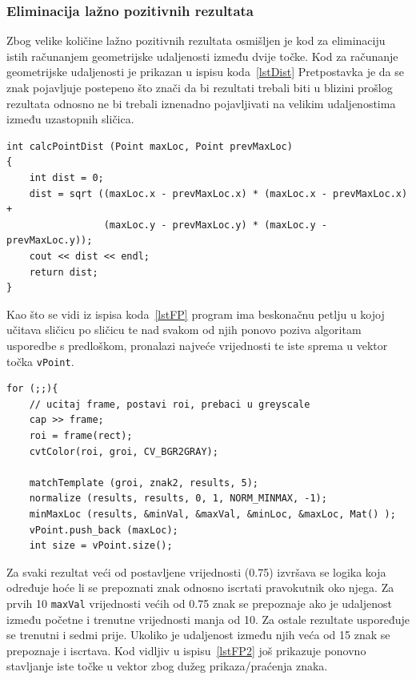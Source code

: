 \newpage
\subsubsection{Eliminacija lažno pozitivnih rezultata} %
\label{ssub:Eliminacija lažno pozitivnih rezultata}

Zbog velike količine lažno pozitivnih rezultata osmišljen je kod za
eliminaciju istih računanjem geometrijske udaljenosti između dvije
točke. Kod za računanje geometrijske udaljenosti je prikazan u ispisu
koda~\ref{lstDist} Pretpostavka je da se znak pojavljuje postepeno što
znači da bi rezultati trebali biti u blizini prošlog rezultata odnosno ne
bi trebali iznenadno pojavljivati na velikim udaljenostima između
uzastopnih sličica. 

\begin{lstlisting}[label=lstDist,caption={Izvorni kod računanja
geometrijske udaljenosti između dvije točke}]
int calcPointDist (Point maxLoc, Point prevMaxLoc)
{
    int dist = 0;
    dist = sqrt ((maxLoc.x - prevMaxLoc.x) * (maxLoc.x - prevMaxLoc.x) +
                 (maxLoc.y - prevMaxLoc.y) * (maxLoc.y - prevMaxLoc.y));    
    cout << dist << endl;
    return dist;
}
\end{lstlisting}

Kao što se vidi iz ispisa koda~\ref{lstFP} program ima beskonačnu petlju
u kojoj učitava sličicu po sličicu te nad svakom od njih ponovo poziva
algoritam usporedbe s predloškom, pronalazi najveće vrijednosti te 
iste sprema u vektor točka \texttt{vPoint}. 

\begin{lstlisting}[label=lstFP,caption={Izvorni kod obrade svih učitanih
        sličica }]
for (;;){
    // ucitaj frame, postavi roi, prebaci u greyscale
    cap >> frame;              
    roi = frame(rect);
    cvtColor(roi, groi, CV_BGR2GRAY);
    
    matchTemplate (groi, znak2, results, 5);
    normalize (results, results, 0, 1, NORM_MINMAX, -1);
    minMaxLoc (results, &minVal, &maxVal, &minLoc, &maxLoc, Mat() );
    vPoint.push_back (maxLoc);
    int size = vPoint.size();
\end{lstlisting}
    
Za svaki rezultat veći od postavljene vrijednosti (0.75) izvršava se
logika koja određuje hoće li se prepoznati znak odnosno iscrtati
pravokutnik oko njega. Za prvih 10 \texttt{maxVal} vrijednosti većih od
0.75 znak se prepoznaje ako je udaljenost između početne i trenutne
vrijednosti manja od 10. Za ostale rezultate uspoređuje se trenutni i
sedmi prije. Ukoliko je udaljenost između njih veća od 15 znak se
prepoznaje i iscrtava. Kod vidljiv u ispisu~\ref{lstFP2} još prikazuje
ponovno stavljanje iste točke u vektor zbog dužeg prikaza/praćenja
znaka. 

